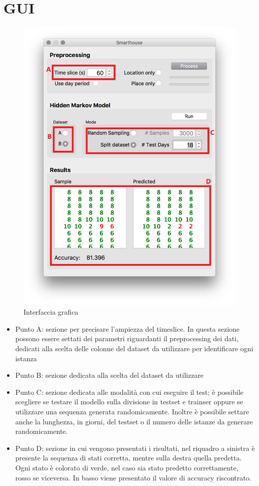 \documentclass[10pt,a4paper]{article}
\begin{document}
	\section{GUI}

	\begin{figure}[!htbp]
	\includegraphics[width=\linewidth]{immagini/gui.png}
	\caption{Interfaccia grafica}
	\label{fig:b_3ks}
	\end{figure}
	\begin{itemize}
	    \item Punto A: sezione per precisare l'ampiezza del timeslice. In questa sezione possono essere settati dei parametri riguardanti il preprocessing dei dati, dedicati alla scelta delle colonne del dataset da utilizzare per identificare ogni istanza
	    \item Punto B: sezione dedicata alla scelta del dataset da utilizzare
	    \item Punto C: sezione dedicata alle modalità con cui eseguire il test; è possibile scegliere se testare il modello sulla divisione in testset e trainser oppure se utilizzare una sequenza generata randomicamente. Inoltre è possibile settare anche la lunghezza, in giorni, del testset o il numero delle istanze da generare randomicamente.
	    \item Punto D: sezione in cui vengono presentati i risultati, nel riquadro a sinistra è presente la sequenza di stati corretta, mentre sulla destra quella predetta. Ogni stato è colorato di verde, nel caso sia stato predetto correttamente, rosso se viceversa. In basso viene presentato il valore di accuracy riscontrato.
	\end{itemize}
\end{document}
